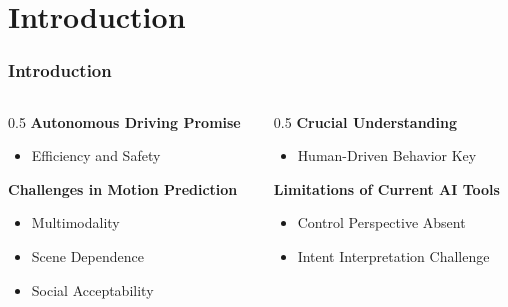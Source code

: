 \section{Introduction}

\begin{frame}
  \frametitle{Introduction}

   \begin{columns}[c]
       \begin{column}{0.5\hsize}
            \textbf{Autonomous Driving Promise}
            \begin{itemize}[]
                \item Efficiency and Safety
            \end{itemize}

            \hfil

            \textbf{Challenges in Motion Prediction}
            
            \begin{itemize}[]
                \item Multimodality
                \item Scene Dependence
                \item Social Acceptability
            \end{itemize}

       \end{column}
       \begin{column}{0.5\hsize}
            \textbf{Crucial Understanding}
            \begin{itemize}[]
                \item Human-Driven Behavior Key
            \end{itemize}

            \hfil

            \textbf{Limitations of Current AI Tools}
            \begin{itemize}[]
                \item Control Perspective Absent
                \item Intent Interpretation Challenge
            \end{itemize}
       \end{column}
   \end{columns}
\end{frame}


